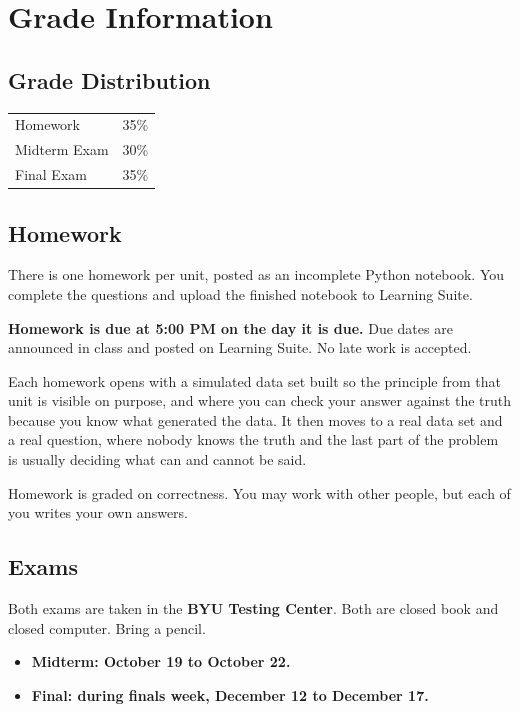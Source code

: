 \documentclass[11pt]{article}
\begin{document}
\section*{Grade Information}

\subsection*{Grade Distribution}
\begin{tabular}{ l l }
Homework & 35\% \\
Midterm Exam & 30\% \\
Final Exam & 35\%
\end{tabular}

\subsection*{Homework}

There is one homework per unit, posted as an incomplete Python notebook. You complete the
questions and upload the finished notebook to Learning Suite.

\textbf{Homework is due at 5:00 PM on the day it is due.} Due dates are announced in class and
posted on Learning Suite. No late work is accepted.

Each homework opens with a simulated data set built so the principle from that unit is visible on
purpose, and where you can check your answer against the truth because you know what generated the
data. It then moves to a real data set and a real question, where nobody knows the truth and the
last part of the problem is usually deciding what can and cannot be said.

Homework is graded on correctness. You may work with other people, but each of you writes your own
answers.

\subsection*{Exams}

Both exams are taken in the \textbf{BYU Testing Center}. Both are closed book and closed computer.
Bring a pencil.

\begin{itemize}[topsep=2pt,itemsep=1pt]
\item \textbf{Midterm: October 19 to October 22.}
\item \textbf{Final: during finals week, December 12 to December 17.}
\end{itemize}
\end{document}
